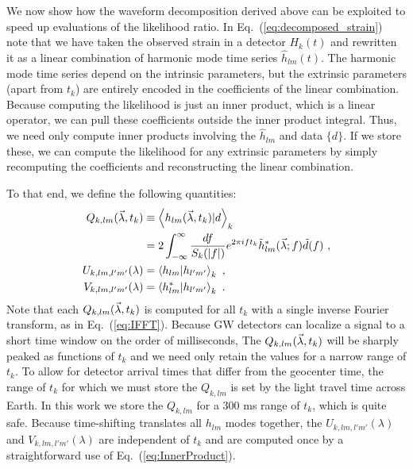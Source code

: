 We now show how the waveform decomposition derived above can be exploited
to speed up evaluations of the likelihood ratio.
In Eq.~(\ref{eq:decomposed_strain}) note that we have taken the observed strain in a detector $H_k(t)$
and rewritten it as a linear combination of harmonic mode time series $\hat{h}_{lm}(t)$.
The harmonic mode time series depend on the intrinsic parameters, but
the extrinsic parameters (apart from $t_k$) are entirely encoded in the coefficients of the linear combination.
Because computing the likelihood is just an inner product, which is a linear operator, 
we can pull these coefficients outside the inner product integral.
Thus, we need only compute inner products involving the $\hat{h}_{lm}$ and data $\{d\}$. 
If we store these, we can compute the likelihood for any extrinsic parameters by simply
recomputing the coefficients and reconstructing the linear combination.

To that end, we define the following quantities:
\begin{subequations}
\label{eq:QUV}
\begin{align}
Q_{k,lm}(\vec{\lambda},t_k) &\equiv \left\langle h_{lm}(\vec{\lambda},t_k)|d\right\rangle_k \nonumber\\
&= 2 \int_{-\infty}^{\infty} \frac{df}{S_k(|f|)} e^{2\pi i f t_k} \tilde{h}_{lm}^*(\vec{\lambda};f) \tilde{d}(f)\ , \\
{ U_{k,lm,l'm'}(\lambda)}& = \left\langle h_{lm}|h_{l'm'}\right\rangle_k\ , \\
V_{k,lm,l'm'}(\lambda)& = \left\langle h_{lm}^*|h_{l'm'}\right\rangle_k  \ .
\end{align}
\end{subequations}
Note that each $Q_{k,lm}(\vec{\lambda},t_k)$ is computed for all $t_k$ with a single inverse Fourier transform, 
as in Eq.~(\ref{eq:IFFT}). Because GW detectors can localize a signal to a short time window 
on the order of milliseconds, The $Q_{k,lm}(\vec{\lambda},t_k)$ will be sharply peaked as functions of $t_k$ 
and we need only retain the values for a narrow range of $t_k$. To allow for detector arrival times that differ
from the geocenter time, the range of $t_k$ for which we must store the $Q_{k,lm}$ is set by the light travel
time across Earth. In this work we store the $Q_{k,lm}$ for a $300$ ms range of $t_k$, which is quite safe.
Because time-shifting translates all $h_{lm}$ modes together, 
the $U_{k,lm,l'm'}(\lambda)$ and $V_{k,lm,l'm'}(\lambda)$ are independent of $t_k$
and are computed once by a straightforward use of Eq.~(\ref{eq:InnerProduct}).


